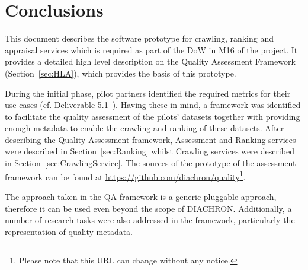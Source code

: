
\section{Conclusions}
\label{sec:Conclusion} 

This document describes the software prototype for crawling, ranking and appraisal services which is required as part of the DoW in M16 of the project.
It provides a detailed high level description on the Quality Assessment Framework (Section~\ref{sec:HLA}), which provides the basis of this prototype.

During the initial phase, pilot partners identified the required metrics for their use cases (cf. Deliverable 5.1~\cite{diachron-d5.1}).
Having these in mind, a framework was identified to facilitate the quality assessment of the pilots' datasets together with providing enough metadata to enable the crawling and ranking of these datasets.
After describing the Quality Assessment framework, Assessment and Ranking services were described in Section~\ref{sec:Ranking} whilst Crawling services were described in Section~\ref{sec:CrawlingService}.
The sources of the prototype of the assessment framework can be found at \url{https://github.com/diachron/quality}\footnote{Please note that this URL can change without any notice.}.

The approach taken in the QA framework is a generic pluggable approach, therefore it can be used even beyond the scope of DIACHRON.
Additionally, a number of research tasks were also addressed in the framework, particularly the representation of quality metadata.